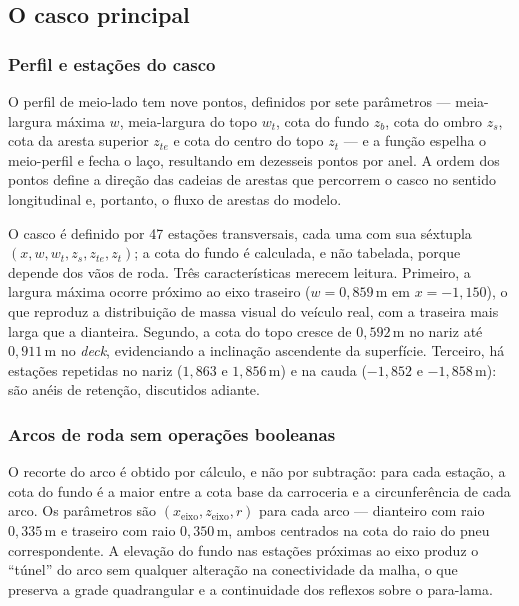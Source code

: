 \subsection{O casco principal}

\subsubsection{Perfil e esta\c{c}\~oes do casco}

O perfil de meio-lado tem nove pontos, definidos por sete par\^ametros --- meia-largura
m\'axima $w$, meia-largura do topo $w_t$, cota do fundo $z_b$, cota do ombro $z_s$, cota
da aresta superior $z_{te}$ e cota do centro do topo $z_t$ --- e a fun\c{c}\~ao espelha o
meio-perfil e fecha o la\c{c}o, resultando em dezesseis pontos por anel. A ordem dos
pontos define a dire\c{c}\~ao das cadeias de arestas que percorrem o casco no sentido
longitudinal e, portanto, o fluxo de arestas do modelo.

O casco \'e definido por 47 esta\c{c}\~oes transversais, cada uma com sua s\'extupla
$(x, w, w_t, z_s, z_{te}, z_t)$; a cota do fundo \'e calculada, e n\~ao tabelada, porque
depende dos v\~aos de roda. Tr\^es caracter\'isticas merecem leitura. Primeiro, a largura
m\'axima ocorre pr\'oximo ao eixo traseiro ($w = 0{,}859$\,m em $x = -1{,}150$), o que
reproduz a distribui\c{c}\~ao de massa visual do ve\'iculo real, com a traseira mais larga
que a dianteira. Segundo, a cota do topo cresce de $0{,}592$\,m no nariz at\'e
$0{,}911$\,m no \emph{deck}, evidenciando a inclina\c{c}\~ao ascendente da superf\'icie.
Terceiro, h\'a esta\c{c}\~oes repetidas no nariz ($1{,}863$ e $1{,}856$\,m) e na cauda
($-1{,}852$ e $-1{,}858$\,m): s\~ao an\'eis de reten\c{c}\~ao, discutidos adiante.

\subsubsection{Arcos de roda sem opera\c{c}\~oes booleanas}

O recorte do arco \'e obtido por c\'alculo, e n\~ao por subtra\c{c}\~ao: para cada
esta\c{c}\~ao, a cota do fundo \'e a maior entre a cota base da carroceria e a
circunfer\^encia de cada arco. Os par\^ametros s\~ao $(x_{\text{eixo}},
z_{\text{eixo}}, r)$ para cada arco --- dianteiro com raio $0{,}335$\,m e traseiro com
raio $0{,}350$\,m, ambos centrados na cota do raio do pneu correspondente. A
eleva\c{c}\~ao do fundo nas esta\c{c}\~oes pr\'oximas ao eixo produz o ``t\'unel'' do arco
sem qualquer altera\c{c}\~ao na conectividade da malha, o que preserva a grade quadrangular
e a continuidade dos reflexos sobre o para-lama.

